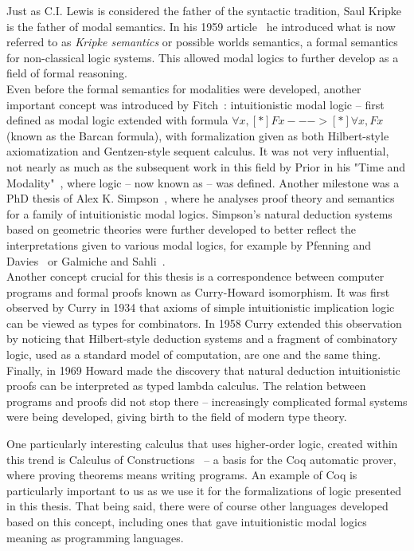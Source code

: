 Just as C.I. Lewis is considered the father of the syntactic tradition, Saul Kripke is the father of modal semantics. In his 1959 article~\cite{kripke59}  he introduced what is now referred to as \emph{Kripke semantics} or possible worlds semantics, a formal semantics for non-classical logic systems. This allowed modal logics to further develop as a field of formal reasoning.\\

Even before the formal semantics for modalities were developed, another important concept was introduced by Fitch~\cite{fitch52}: intuitionistic modal logic -- first defined as modal logic \logicT{} extended with formula ${\forall x, [*]F x ---> [*] \forall x, F x}$ (known as the Barcan formula), with formalization given as both Hilbert-style axiomatization and Gentzen-style sequent calculus. It was not very influential, not nearly as much as the subsequent work in this field by Prior in his "Time and Modality"~\cite{prior55}, where \mipq{} logic -- now known as \logic{} -- was defined. Another milestone was a PhD thesis of Alex K. Simpson~\cite{simpson}, where he analyses proof theory and semantics for a family of intuitionistic modal logics. Simpson's natural deduction systems based on geometric theories were further developed to better reflect the interpretations given to various modal logics, for example by Pfenning and Davies~\cite{stagedcomp} or Galmiche and Sahli~\cite{labelfree}.\\

Another concept crucial for this thesis is a correspondence between computer programs and formal proofs known as Curry-Howard isomorphism. It was first observed by Curry in 1934 that axioms of simple intuitionistic implication logic can be viewed as types for combinators. In 1958 Curry extended this observation by noticing that Hilbert-style deduction systems and a fragment of combinatory logic, used as a standard model of computation, are one and the same thing. Finally, in 1969 Howard made the discovery that natural deduction intuitionistic proofs can be interpreted as typed lambda calculus. The relation between programs and proofs did not stop there -- increasingly complicated formal systems were being developed, giving birth to the field of modern type theory. 

One particularly interesting calculus that uses higher-order logic, created within this trend is Calculus of Constructions~\cite{coq_coc} -- a basis for the Coq automatic prover, where proving theorems means writing programs. An example of Coq is particularly important to us as we use it for the formalizations of \logic{} logic presented in this thesis. That being said, there were of course other languages developed based on this concept, including ones that gave intuitionistic modal logics meaning as programming languages.

